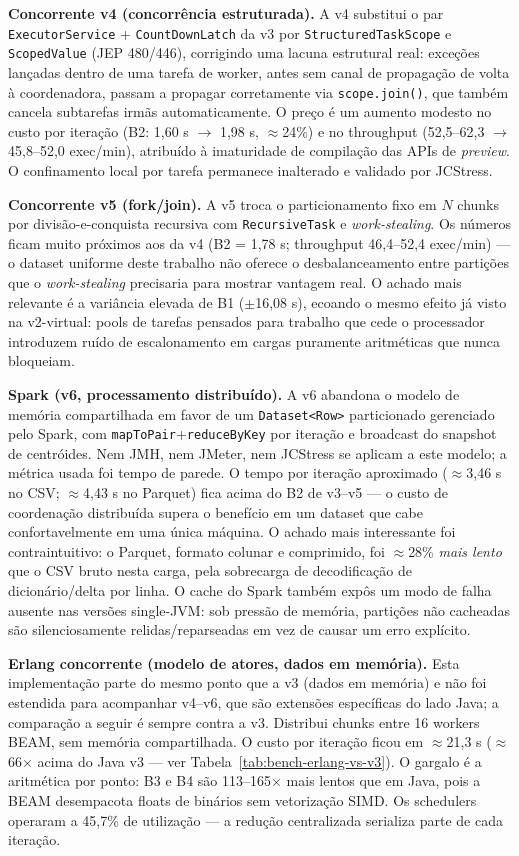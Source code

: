 \textbf{Concorrente v4 (concorrência estruturada).}
A v4 substitui o par \texttt{ExecutorService} + \texttt{CountDownLatch} da v3
por \texttt{StructuredTaskScope} e \texttt{ScopedValue} (JEP 480/446), corrigindo uma
lacuna estrutural real: exceções lançadas dentro de uma tarefa de worker, antes
sem canal de propagação de volta à coordenadora, passam a propagar corretamente
via \texttt{scope.join()}, que também cancela subtarefas irmãs automaticamente.
O preço é um aumento modesto no custo por iteração (B2: 1{,}60 s $\to$ 1{,}98 s,
$\approx$24\%) e no throughput (52,5--62,3 $\to$ 45,8--52,0 exec/min), atribuído
à imaturidade de compilação das APIs de \textit{preview}. O confinamento local
por tarefa permanece inalterado e validado por JCStress.

\textbf{Concorrente v5 (fork/join).}
A v5 troca o particionamento fixo em $N$ chunks por divisão-e-conquista
recursiva com \texttt{RecursiveTask} e \textit{work-stealing}. Os números ficam
muito próximos aos da v4 (B2 = 1{,}78 s; throughput 46,4--52,4 exec/min) --- o
dataset uniforme deste trabalho não oferece o desbalanceamento entre partições
que o \textit{work-stealing} precisaria para mostrar vantagem real. O achado
mais relevante é a variância elevada de B1 ($\pm$16{,}08 s), ecoando o mesmo
efeito já visto na v2-virtual: pools de tarefas pensados para trabalho que
cede o processador introduzem ruído de escalonamento em cargas puramente
aritméticas que nunca bloqueiam.

\textbf{Spark (v6, processamento distribuído).}
A v6 abandona o modelo de memória compartilhada em favor de um
\texttt{Dataset<Row>} particionado gerenciado pelo Spark, com
\texttt{mapToPair}+\texttt{reduceByKey} por iteração e broadcast do snapshot de
centróides. Nem JMH, nem JMeter, nem JCStress se aplicam a este modelo; a
métrica usada foi tempo de parede. O tempo por iteração aproximado
($\approx$3{,}46 s no CSV; $\approx$4{,}43 s no Parquet) fica acima do B2 de
v3--v5 --- o custo de coordenação distribuída supera o benefício em um dataset
que cabe confortavelmente em uma única máquina. O achado mais interessante foi
contraintuitivo: o Parquet, formato colunar e comprimido, foi
$\approx$28\% \textit{mais lento} que o CSV bruto nesta carga, pela sobrecarga
de decodificação de dicionário/delta por linha. O cache do Spark também expôs
um modo de falha ausente nas versões single-JVM: sob pressão de memória,
partições não cacheadas são silenciosamente relidas/reparseadas em vez de
causar um erro explícito.

\textbf{Erlang concorrente (modelo de atores, dados em memória).}
Esta implementação parte do mesmo ponto que a v3 (dados em memória) e não foi
estendida para acompanhar v4--v6, que são extensões específicas do lado Java;
a comparação a seguir é sempre contra a v3. Distribui chunks entre 16 workers
BEAM, sem memória compartilhada. O custo por
iteração ficou em $\approx$21{,}3 s ($\approx$66$\times$ acima do Java v3 --- ver Tabela~\ref{tab:bench-erlang-vs-v3}). O gargalo é
a aritmética por ponto: B3 e B4 são 113--165$\times$ mais lentos que em Java,
pois a BEAM desempacota floats de binários sem vetorização SIMD. Os schedulers
operaram a 45{,}7\% de utilização — a redução centralizada serializa parte de
cada iteração.

